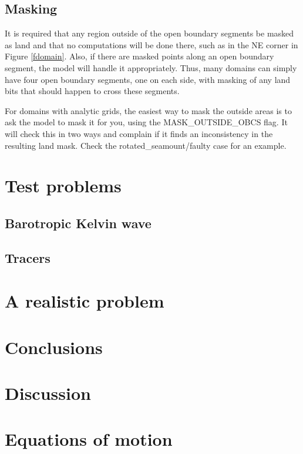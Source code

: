 \documentclass[11pt]{article}
\begin{document}
\subsection{Masking}
It is required that any region outside of the open boundary segments
be masked as land and that no computations will be done there, such
as in the NE corner in Figure \ref{fdomain}. Also, if there are
masked points along an open boundary segment, the model will handle
it appropriately. Thus, many domains can simply have four open
boundary segments, one on each side, with masking of any land bits
that should happen to cross these segments.

For domains with analytic grids, the easiest way to mask the outside
areas is to ask the model to mask it for you, using the MASK\_OUTSIDE\_OBCS
flag. It will check this in two ways and complain if it finds an
inconsistency in the resulting land mask. Check the rotated\_seamount/faulty
case for an example.

\section{Test problems}
\subsection{Barotropic Kelvin wave}
\subsection{Tracers}
\section{A realistic problem}
\section{Conclusions}
\section{Discussion}

\section{Equations of motion}
\end{document}
